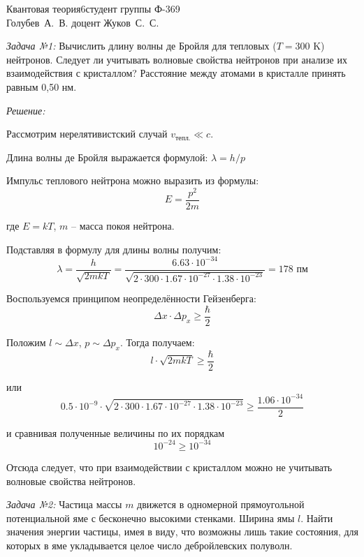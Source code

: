 



\usepackage{wrapfig}


{Квантовая теория}{}{6}{студент группы Ф-369\\Голубев~А.~В.}
{}{доцент Жуков~С.~С.}{}{}


\emph{Задача №1:} Вычислить длину волны де Бройля для тепловых 
(\( T = 300 \) K) нейтронов. Следует ли учитывать волновые свойства нейтронов 
при анализе их взаимодействия с кристаллом? Расстояние между атомами в 
кристалле принять равным 0,50 нм.

\emph{Решение:}

Рассмотрим нерелятивистский случай \( v_\text{тепл.} \ll c \).

Длина волны де Бройля выражается формулой: \( \lambda = h/p\)

Импульс теплового нейтрона можно выразить из формулы: 
\[	
	E = \frac{p^2}{2m}
\] 

где \( E = kT \), \( m \) -- масса покоя нейтрона.

Подставляя в формулу для длины волны получим:
\[
	\lambda = \frac{h}{\sqrt{2mkT}} = 
	\frac{6.63\cdot10^{-34}}
	{\sqrt{2\cdot300\cdot1.67\cdot10^{-27}\cdot1.38\cdot10^{-23}}} =
	178 \text{ пм}
\]

Воспользуемся принципом неопределённости Гейзенберга:
\[
	\Delta x \cdot \Delta p_x \geq \frac{\hbar}{2}
\]

Положим \( l \sim \Delta x \), \( p \sim \Delta p_x \). Тогда получаем:
\[
	l\cdot \sqrt{2mkT} \geq \frac{\hbar}{2} 
\]

или
\[ 
	0.5\cdot10^{-9} \cdot 
	\sqrt{2\cdot300\cdot1.67\cdot10^{-27}\cdot1.38\cdot10^{-23}} \geq
	\frac{1.06\cdot10^{-34}}{2}
\]

и сравнивая полученные величины по их порядкам
\[
	10^{-24} \geq 10^{-34}
\]

Отсюда следует, что при взаимодействии с кристаллом можно не учитывать волновые 
свойства нейтронов.

\pagebreak

\emph{Задача №2:} Частица массы \( m \) движется в одномерной прямоугольной 
потенциальной яме с бесконечно высокими стенками. Ширина ямы \( l \). Найти 
значения энергии частицы, имея в виду, что возможны лишь такие состояния, для 
которых в яме укладывается целое число дебройлевских полуволн. 

